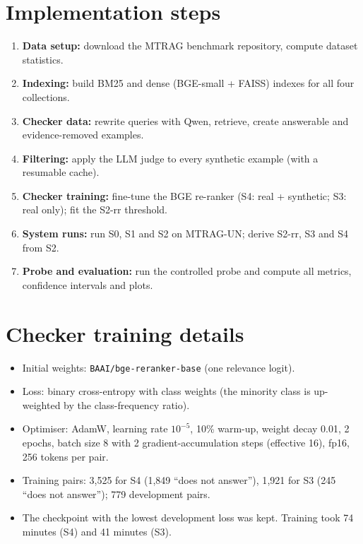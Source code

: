 \documentclass[11pt,a4paper]{report}
\newcommand{\sys}[1]{\textsf{#1}}
\begin{document}
\section{Implementation steps}
\begin{enumerate}
\item \textbf{Data setup:} download the MTRAG benchmark repository, compute dataset statistics.
\item \textbf{Indexing:} build BM25 and dense (BGE-small + FAISS) indexes for all four collections.
\item \textbf{Checker data:} rewrite queries with Qwen, retrieve, create answerable and evidence-removed examples.
\item \textbf{Filtering:} apply the LLM judge to every synthetic example (with a resumable cache).
\item \textbf{Checker training:} fine-tune the BGE re-ranker (\sys{S4}: real + synthetic; \sys{S3}: real only); fit the \sys{S2-rr} threshold.
\item \textbf{System runs:} run \sys{S0}, \sys{S1} and \sys{S2} on MTRAG-UN; derive \sys{S2-rr}, \sys{S3} and \sys{S4} from \sys{S2}.
\item \textbf{Probe and evaluation:} run the controlled probe and compute all metrics, confidence intervals and plots.
\end{enumerate}

\section{Checker training details}
\begin{itemize}
\item Initial weights: \texttt{BAAI/bge-reranker-base} (one relevance logit).
\item Loss: binary cross-entropy with class weights (the minority class is up-weighted by the class-frequency ratio).
\item Optimiser: AdamW, learning rate $10^{-5}$, 10\% warm-up, weight decay 0.01, 2 epochs, batch size 8 with 2 gradient-accumulation steps (effective 16), fp16, 256 tokens per pair.
\item Training pairs: 3{,}525 for \sys{S4} (1{,}849 ``does not answer''), 1{,}921 for \sys{S3} (245 ``does not answer''); 779 development pairs.
\item The checkpoint with the lowest development loss was kept. Training took 74 minutes (\sys{S4}) and 41 minutes (\sys{S3}).
\end{itemize}
\end{document}
